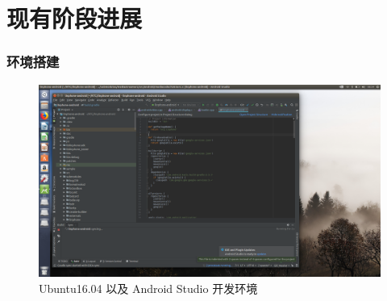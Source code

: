 \documentclass[xcolor=dvipsnames]{beamer}
\begin{document}
\section{现有阶段进展}
\begin{frame}
  \frametitle{环境搭建}
  \begin{figure}
    \centering
    \includegraphics[scale=0.15]{images/environment.jpg}
    \caption{Ubuntu16.04 以及 Android Studio 开发环境}
    \label{}
  \end{figure}
\end{frame}
\end{document}

